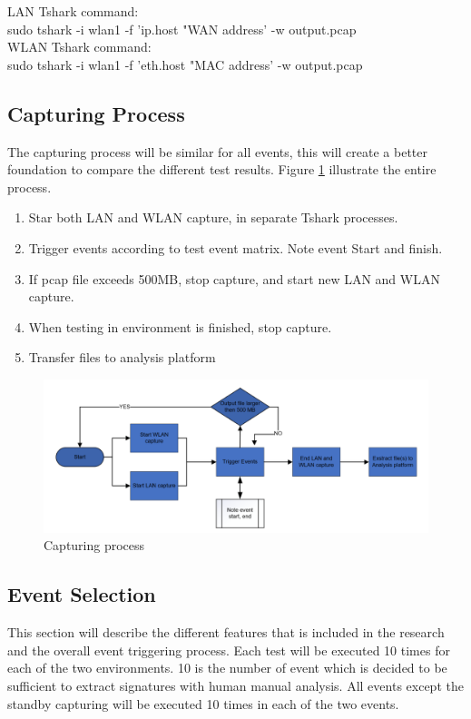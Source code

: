 LAN Tshark command:
\\
sudo tshark -i wlan1 -f 'ip.host "WAN address' -w output.pcap
\\
WLAN Tshark command:
\\
sudo tshark -i wlan1 -f 'eth.host "MAC address' -w output.pcap
\\

\subsection{Capturing Process}
The capturing process will be similar for all events, this will create a better foundation to compare the different test results. 
Figure \ref{fig:captuingprocess} illustrate the entire process.
\begin{enumerate}
    \item Star both LAN and WLAN capture, in separate Tshark processes.
    \item Trigger events according to test event matrix. Note event Start and finish. 
    \item If pcap file exceeds 500MB, stop capture, and start new LAN and WLAN capture.
    \item When testing in environment is finished, stop capture. 
    \item Transfer files to analysis platform
\end{enumerate}
   

\begin{figure}[H]
    \centering
    \includegraphics[width=\textwidth]{figures/Event triggering process.png}
    \caption{Capturing process}
    \label{fig:captuingprocess}
\end{figure}

\subsection{Event Selection}
This section will describe the different features that is included in the research and the overall event triggering process. Each test will be executed 10 times for each of the two environments. 10 is the number of event which is decided to be sufficient to extract signatures with human manual analysis. All events except the standby capturing will be executed 10 times in each of the two events. 


